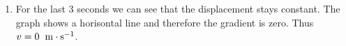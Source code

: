 {\begin{mdframed}[linewidth=4, leftmargin=40, rightmargin=40]
\begin{exercise}
\begin{enumerate}[noitemsep, label=\textbf{Step} \textbf{\arabic*}. ]
    \begin{equation}
    \begin{array}{ccc}\hfill v& =& \frac{\Delta x}{\Delta t}\hfill \\ & =& \frac{4\phantom{\rule{3.33333pt}{0ex}}\mathrm{m}-0\phantom{\rule{3.33333pt}{0ex}}\mathrm{m}}{4\phantom{\rule{3.33333pt}{0ex}}\mathrm{s}-0\phantom{\rule{3.33333pt}{0ex}}\mathrm{s}}\hfill \\ & =& 1\phantom{\rule{4pt}{0ex}}\phantom{\rule{0.166667em}{0ex}}\mathrm{m}\ensuremath{\cdot}{\mathrm{s}}^{-1}\hfill \end{array}\tag{20.40}
      \end{equation}
      \item  
      \label{m38795*id74801}For the last 3 seconds we can see that the displacement stays constant. The graph shows a horisontal line and therefore the gradient is zero. Thus $v=0\phantom{\rule{4pt}{0ex}}\phantom{\rule{0.166667em}{0ex}}\mathrm{m}\ensuremath{\cdot}{\mathrm{s}}^{-1}$. \par 
      \end{enumerate}
    \end{exercise}
    \end{mdframed}
    }
    \noindent
\label{m38795*secfhsst!!!underscore!!!id3755}\vspace{.5cm} 
      \noindent
